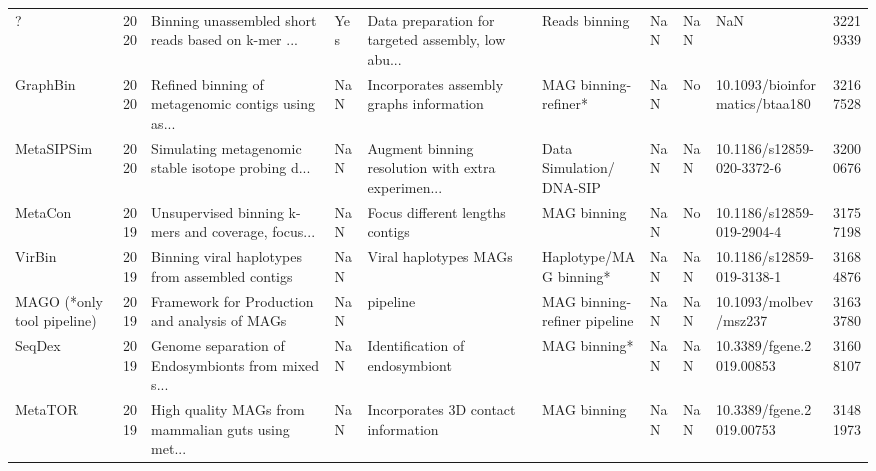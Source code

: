 \begin{tabular}{lrlllllllr}
                         ? &  2020 & Binning unassembled short reads based on k-mer ... &            Yes & Data preparation for targeted assembly, low abu... &                             Reads binning &                                            NaN &                        NaN &                            NaN &  32219339 \\
                  GraphBin &  2020 & Refined binning of metagenomic contigs using as... &            NaN &           Incorporates assembly graphs information &                      MAG binning-refiner* &                                            NaN &                         No & 10.1093/bioinformatics/btaa180 &  32167528 \\
                MetaSIPSim &  2020 & Simulating metagenomic stable isotope probing d... &            NaN & Augment binning resolution with extra experimen... &                  Data Simulation/ DNA-SIP &                                            NaN &                        NaN &      10.1186/s12859-020-3372-6 &  32000676 \\
                   MetaCon &  2019 & Unsupervised binning k-mers and coverage, focus... &            NaN &                    Focus different lengths contigs &                               MAG binning &                                            NaN &                         No &      10.1186/s12859-019-2904-4 &  31757198 \\
                    VirBin &  2019 &    Binning viral haplotypes from assembled contigs &            NaN &                              Viral haplotypes MAGs &                    Haplotype/MAG binning* &                                            NaN &                        NaN &      10.1186/s12859-019-3138-1 &  31684876 \\
MAGO (*only tool pipeline) &  2019 &      Framework for Production and analysis of MAGs &            NaN &                                           pipeline &              MAG binning-refiner pipeline &                                            NaN &                        NaN &          10.1093/molbev/msz237 &  31633780 \\
                    SeqDex &  2019 & Genome separation of Endosymbionts from mixed s... &            NaN &                     Identification of endosymbiont &                              MAG binning* &                                            NaN &                        NaN &       10.3389/fgene.2019.00853 &  31608107 \\
                   MetaTOR &  2019 & High quality MAGs from mammalian guts using met... &            NaN &                Incorporates 3D contact information &                               MAG binning &                                            NaN &                        NaN &       10.3389/fgene.2019.00753 &  31481973 \\

\end{tabular}
